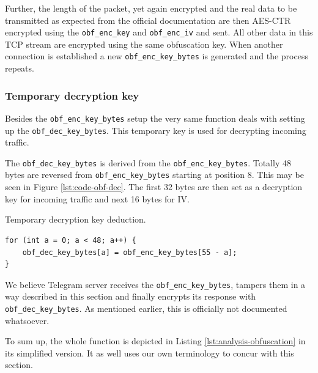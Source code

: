 \documentclass[thesis=M,english]{FITthesis}[2012/10/20]
\begin{document}
Further, the length of the packet, yet again encrypted and the real data to be transmitted as expected from the official documentation are then AES-CTR encrypted using the \texttt{obf\_enc\_key} and \texttt{obf\_enc\_iv} and sent. All other data in this TCP stream are encrypted using the same obfuscation key. When another connection is established a new \texttt{obf\_enc\_key\_bytes} is generated and the process repeats.

\subsubsection{Temporary decryption key}

Besides the \texttt{obf\_enc\_key\_bytes} setup the very same function deals with setting up the \texttt{obf\_dec\_key\_bytes}. This temporary key is used for decrypting incoming traffic.

The \texttt{obf\_dec\_key\_bytes} is derived from the \texttt{obf\_enc\_key\_bytes}. Totally 48 bytes are reversed from \texttt{obf\_enc\_key\_bytes} starting at position 8. This may be seen in Figure \ref{lst:code-obf-dec}. The first 32 bytes are then set as a decryption key for incoming traffic and next 16 bytes for IV.

\begin{listing}[htb]
\caption{Temporary decryption key deduction.}
\label{lst:code-obf-dec}
\begin{verbatim}
for (int a = 0; a < 48; a++) {
    obf_dec_key_bytes[a] = obf_enc_key_bytes[55 - a];
}
\end{verbatim}
\end{listing}

We believe Telegram server receives the \texttt{obf\_enc\_key\_bytes}, tampers them in a way described in this section and finally encrypts its response with \texttt{obf\_dec\_key\_bytes}. As mentioned earlier, this is officially not documented whatsoever.

To sum up, the whole function is depicted in Listing \ref{lst:analysis-obfuscation} in its simplified version. It as well uses our own terminology to concur with this section.
\end{document}
